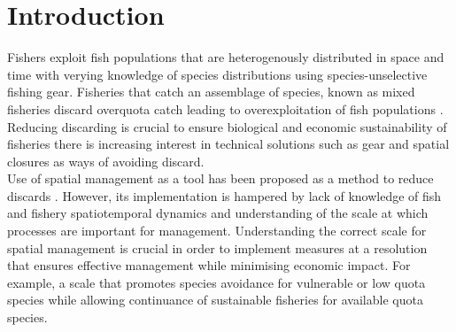 \documentclass[review]{elsarticle}
\begin{document}
\linenumbers

\section{Introduction}

%
Fishers exploit fish populations that are heterogenously distributed in space
and time with verying knowledge of species distributions using
species-unselective fishing gear. Fisheries that catch an assemblage of
species, known as mixed fisheries  discard overquota
catch  leading to
overexploitation of fish populations .   Reducing discarding is crucial to ensure
biological and economic sustainability of fisheries there is increasing interest
in technical solutions such as gear and spatial closures as ways of avoiding
discard.  \\

Use of spatial management as a tool has been proposed as a method to reduce
discards . However, its
implementation is hampered by lack of knowledge of fish and fishery
spatiotemporal dynamics and understanding of the scale at which processes are
important for management. Understanding the correct scale for spatial
management is crucial in order to implement measures at a resolution that
ensures effective management \citep{Dunn2016} while minimising economic impact.
For example, a scale that promotes species avoidance for vulnerable or low
quota species while allowing continuance of sustainable fisheries for available
quota species. \\
\end{document}
